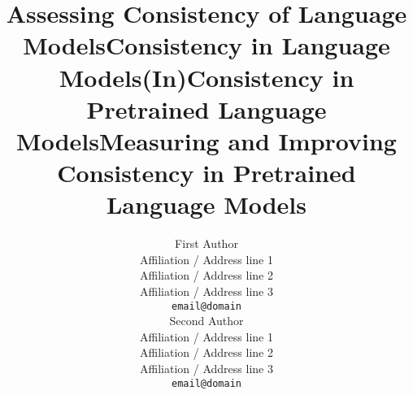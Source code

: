 \documentclass[11pt]{article}
\title{Assessing Consistency of Language Models}
\title{Consistency in Language Models}
\title{(In)Consistency in Pretrained Language Models}
\title{Measuring and Improving Consistency in Pretrained Language Models}
\author{First Author \\
  Affiliation / Address line 1 \\
  Affiliation / Address line 2 \\
  Affiliation / Address line 3 \\
  \texttt{email@domain} \\\And
  Second Author \\
  Affiliation / Address line 1 \\
  Affiliation / Address line 2 \\
  Affiliation / Address line 3 \\
  \texttt{email@domain} \\}
\begin{document}
\maketitle
\begin{abstract}

\end{abstract}


% 




















% 

% 










\end{document}
